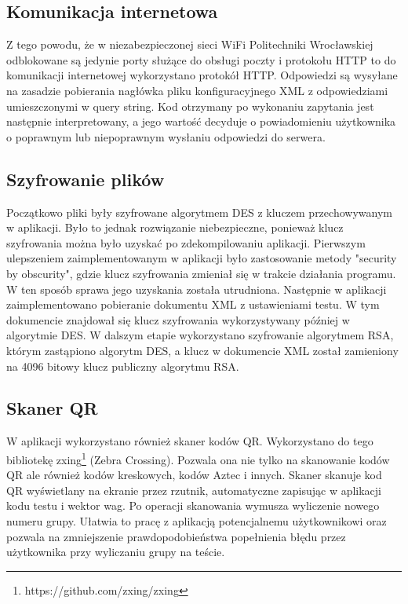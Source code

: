 \documentclass{report}
\begin{document}
			\subsection{Komunikacja internetowa}
			
			Z tego powodu, że w niezabezpieczonej sieci WiFi Politechniki Wrocławskiej odblokowane są jedynie porty służące do obsługi poczty i protokołu HTTP to do komunikacji internetowej wykorzystano protokół HTTP. Odpowiedzi są wysyłane na zasadzie pobierania nagłówka pliku konfiguracyjnego XML z odpowiedziami umieszczonymi w query string. Kod otrzymany po wykonaniu zapytania jest następnie interpretowany, a jego wartość decyduje o powiadomieniu użytkownika o poprawnym lub niepoprawnym wysłaniu odpowiedzi do serwera.
		
			\subsection{Szyfrowanie plików}
		
			Początkowo pliki były szyfrowane algorytmem DES z kluczem przechowywanym w aplikacji. Było to jednak rozwiązanie niebezpieczne, ponieważ klucz szyfrowania można było uzyskać po zdekompilowaniu aplikacji. Pierwszym ulepszeniem zaimplementowanym w aplikacji było zastosowanie metody "security by obscurity", gdzie klucz szyfrowania zmieniał się w trakcie działania programu. W ten sposób sprawa jego uzyskania została utrudniona. Następnie w aplikacji zaimplementowano pobieranie dokumentu XML z ustawieniami testu. W tym dokumencie znajdował się klucz szyfrowania wykorzystywany później w algorytmie DES. W dalszym etapie wykorzystano szyfrowanie algorytmem RSA, którym zastąpiono algorytm DES, a klucz w dokumencie XML został zamieniony na 4096 bitowy klucz publiczny algorytmu RSA.
		
			\subsection{Skaner QR}
			
			W aplikacji wykorzystano również skaner kodów QR. Wykorzystano do tego bibliotekę zxing\footnote{https://github.com/zxing/zxing} (Zebra Crossing). Pozwala ona nie tylko na skanowanie kodów QR ale również kodów kreskowych, kodów Aztec i innych. Skaner skanuje kod QR wyświetlany na ekranie przez rzutnik, automatyczne zapisując w aplikacji kodu testu i wektor wag. Po operacji skanowania wymusza wyliczenie nowego numeru grupy. Ułatwia to pracę z aplikacją potencjalnemu użytkownikowi oraz pozwala na zmniejszenie prawdopodobieństwa popełnienia błędu przez użytkownika przy wyliczaniu grupy na teście.
			
\end{document}
